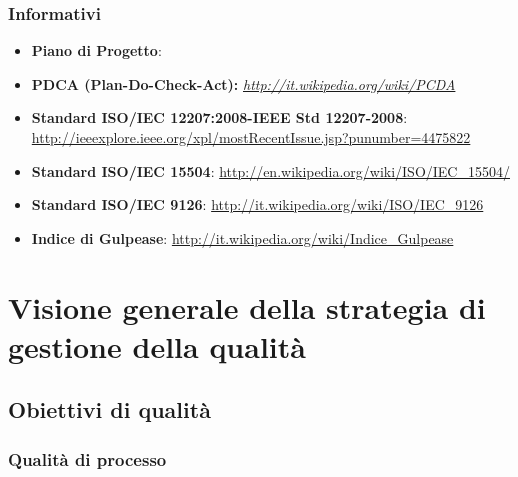\subsubsection{Informativi}

\begin{itemize}
\item \textbf{Piano di Progetto}: \pianodiprogetto
\item \textbf{PDCA (Plan-Do-Check-Act): } \emph{\url{http://it.wikipedia.org/wiki/PCDA}}
\item \textbf{Standard ISO/IEC 12207:2008-IEEE Std 12207-2008}: \url{http://ieeexplore.ieee.org/xpl/mostRecentIssue.jsp?punumber=4475822}
\item \textbf{Standard ISO/IEC 15504}:  \url{http://en.wikipedia.org/wiki/ISO/IEC\_15504/}
\item \textbf{Standard ISO/IEC 9126}: \url{http://it.wikipedia.org/wiki/ISO/IEC\_9126}
\item \textbf{Indice di Gulpease}: \url{http://it.wikipedia.org/wiki/Indice\_Gulpease}
\end{itemize}



\section[Visione generale della qualità]{Visione generale della strategia di gestione della qualità}



\subsection{Obiettivi di qualità}

\subsubsection{Qualità di processo}


